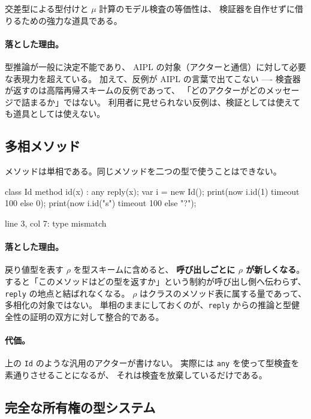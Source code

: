 \documentclass[11pt,a4paper]{ltjsarticle}
\theoremstyle{definition}
\theoremstyle{remark}
\begin{document}
交差型による型付けと $\mu$ 計算のモデル検査の等価性は、
検証器を自作せずに借りるための強力な道具である。

\paragraph{落とした理由。}
型推論が一般に決定不能であり、
AIPL の対象（アクターと通信）に対して必要な表現力を超えている。
加えて、反例が AIPL の言葉で出てこない ----
検査器が返すのは高階再帰スキームの反例であって、
「どのアクターがどのメッセージで詰まるか」ではない。
利用者に見せられない反例は、検証としては使えても道具としては使えない。

\subsection{多相メソッド}

メソッドは単相である。同じメソッドを二つの型で使うことはできない。

\begin{aipl}
class Id { method id(x) : any { reply(x); } }
var i = new Id();
print(now i.id(1) timeout 100 else 0);
print(now i.id("s") timeout 100 else "?");
\end{aipl}
\begin{term}
 line 3, col 7: type mismatch
\end{term}

\paragraph{落とした理由。}
戻り値型を表す $\rho$ を型スキームに含めると、
\textbf{呼び出しごとに $\rho$ が新しくなる}。
すると「このメソッドはどの型を返すか」という制約が呼び出し側へ伝わらず、
\texttt{reply} の地点と結ばれなくなる。
$\rho$ はクラスのメソッド表に属する量であって、多相化の対象ではない。
単相のままにしておくのが、\texttt{reply} からの推論と型健全性の証明の双方に対して整合的である。

\paragraph{代価。}
上の \texttt{Id} のような汎用のアクターが書けない。
実際には \texttt{any} を使って型検査を素通りさせることになるが、
それは検査を放棄しているだけである。

\subsection{完全な所有権の型システム}
\end{document}
